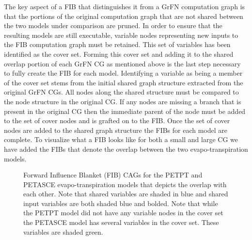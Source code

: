 The key aspect of a FIB that distinguishes it from a GrFN computation graph is that the portions of the original computation graph that are not shared between the two models under comparison are pruned.
In order to ensure that the resulting models are still executable, variable nodes representing new inputs to the FIB computation graph must be retained.
This set of variables has been identified as the cover set.
Forming this cover set and adding it to the shared overlap portion of each GrFN CG as mentioned above is the last step necessary to fully create the FIB for each model.
Identifying a variable as being a member of the cover set stems from the initial shared graph structure extracted from the original GrFN CGs.
All nodes along the shared structure must be compared to the node structure in the original CG.
If any nodes are missing a branch that is present in the original CG then the immediate parent of the node must be added to the set of cover nodes and is grafted on to the FIB.
Once the set of cover nodes are added to the shared graph structure the FIBs for each model are complete.
To visualize what a FIB looks like for both a small and large CG we have added the FIBs that denote the overlap between the two evapo-transpiration models.

\FloatBarrier
\begin{figure}[!tbp]
  \centering

  \caption[Forward Influence Blanket CAG Examples]{Forward Influence Blanket (FIB) CAGs for the PETPT and PETASCE evapo-transpiration models that depicts the overlap with each other. Note that shared variables are shaded in blue and shared input variables are both shaded blue and bolded. Note that while the PETPT model did not have any variable nodes in the cover set the PETASCE model has several variables in the cover set. These variables are shaded green.}
\end{figure}
\FloatBarrier

%


